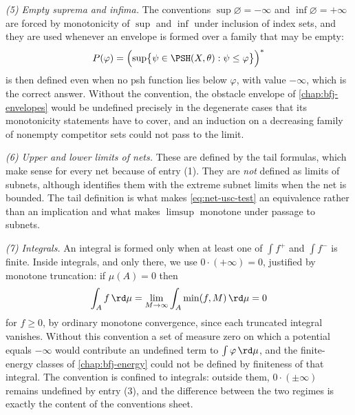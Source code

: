 \emph{(5) Empty suprema and infima.}  The conventions
$\sup\varnothing=-\infty$ and $\inf\varnothing=+\infty$ are forced by
monotonicity of $\sup$ and $\inf$ under inclusion of index sets, and they are
used whenever an envelope is formed over a family that may be empty:
\[
 P(\varphi)=\Bigl(\sup\bigl\{\psi\in\PSH(X,\theta):\psi\leq\varphi\bigr\}\Bigr)^*
\]
is then defined even when no psh function lies below $\varphi$, with value
$-\infty$, which is the correct answer.  Without the convention, the obstacle
envelope of \cref{chap:bfj-envelopes} would be undefined precisely in the
degenerate cases that its monotonicity statements have to cover, and an
induction on a decreasing family of nonempty competitor sets could not pass to
the limit.

\emph{(6) Upper and lower limits of nets.}  These are defined by the tail
formulas, which make sense for every net because of entry (1).  They are
\emph{not} defined as limits of subnets, although
 identifies them with the extreme subnet limits
when the net is bounded.  The tail definition is what makes
\eqref{eq:net-usc-test} an equivalence rather than an implication and what
makes $\limsup$ monotone under passage to subnets.

\emph{(7) Integrals.}  An integral is formed only when at least one of
$\int f^+$ and $\int f^-$ is finite.  Inside integrals, and only there, we use
$0\cdot(+\infty)=0$, justified by monotone truncation: if $\mu(A)=0$ then
\[
 \int_A f\,\rd\mu=\lim_{M\to\infty}\int_A\min(f,M)\,\rd\mu=0
\]
for $f\geq0$, by ordinary monotone convergence, since each truncated integral
vanishes.
Without this convention a set of measure zero on which a potential equals
$-\infty$ would contribute an undefined term to
$\int\varphi\,\rd\mu$, and the finite-energy classes of
\cref{chap:bfj-energy} could not be defined by finiteness of that integral.
The convention is confined to integrals: outside them,
$0\cdot(\pm\infty)$ remains undefined by entry (3), and the difference
between the two regimes is exactly the content of the conventions sheet.

